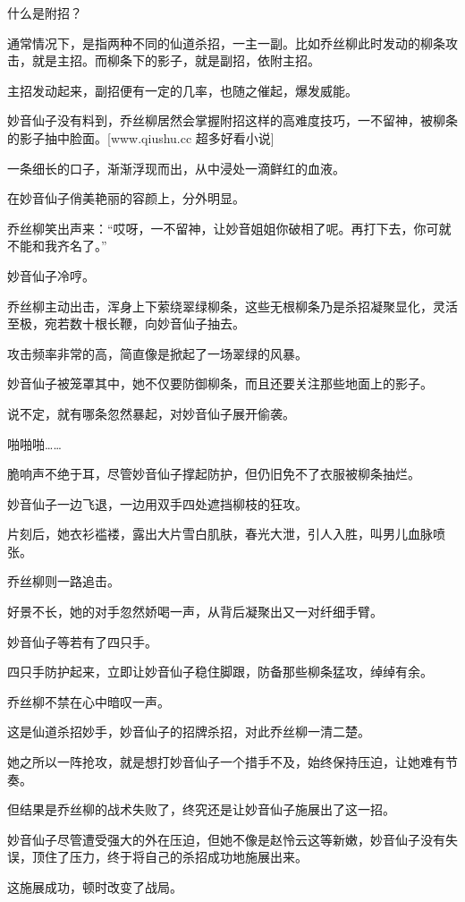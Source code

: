 \begin{this_body}
什么是附招？

通常情况下，是指两种不同的仙道杀招，一主一副。比如乔丝柳此时发动的柳条攻击，就是主招。而柳条下的影子，就是副招，依附主招。

主招发动起来，副招便有一定的几率，也随之催起，爆发威能。

妙音仙子没有料到，乔丝柳居然会掌握附招这样的高难度技巧，一不留神，被柳条的影子抽中脸面。[www.qiushu.cc 超多好看小说]

一条细长的口子，渐渐浮现而出，从中浸处一滴鲜红的血液。

在妙音仙子俏美艳丽的容颜上，分外明显。

乔丝柳笑出声来：“哎呀，一不留神，让妙音姐姐你破相了呢。再打下去，你可就不能和我齐名了。”

妙音仙子冷哼。

乔丝柳主动出击，浑身上下萦绕翠绿柳条，这些无根柳条乃是杀招凝聚显化，灵活至极，宛若数十根长鞭，向妙音仙子抽去。

攻击频率非常的高，简直像是掀起了一场翠绿的风暴。

妙音仙子被笼罩其中，她不仅要防御柳条，而且还要关注那些地面上的影子。

说不定，就有哪条忽然暴起，对妙音仙子展开偷袭。

啪啪啪……

脆响声不绝于耳，尽管妙音仙子撑起防护，但仍旧免不了衣服被柳条抽烂。

妙音仙子一边飞退，一边用双手四处遮挡柳枝的狂攻。

片刻后，她衣衫褴褛，露出大片雪白肌肤，春光大泄，引人入胜，叫男儿血脉喷张。

乔丝柳则一路追击。

好景不长，她的对手忽然娇喝一声，从背后凝聚出又一对纤细手臂。

妙音仙子等若有了四只手。

四只手防护起来，立即让妙音仙子稳住脚跟，防备那些柳条猛攻，绰绰有余。

乔丝柳不禁在心中暗叹一声。

这是仙道杀招妙手，妙音仙子的招牌杀招，对此乔丝柳一清二楚。

她之所以一阵抢攻，就是想打妙音仙子一个措手不及，始终保持压迫，让她难有节奏。

但结果是乔丝柳的战术失败了，终究还是让妙音仙子施展出了这一招。

妙音仙子尽管遭受强大的外在压迫，但她不像是赵怜云这等新嫩，妙音仙子没有失误，顶住了压力，终于将自己的杀招成功地施展出来。

这施展成功，顿时改变了战局。


\end{this_body}
